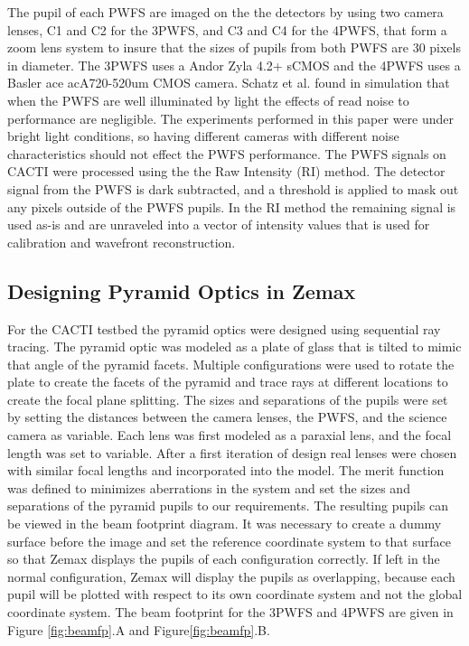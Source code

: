 The pupil of each PWFS are imaged on the the detectors by using two camera lenses, C1 and C2 for the 3PWFS, and C3 and C4 for the 4PWFS,  that form a zoom lens system to insure that the sizes of pupils from both PWFS are 30 pixels in diameter. The 3PWFS uses a Andor Zyla 4.2+ sCMOS and the 4PWFS uses a Basler ace acA720-520um CMOS camera. Schatz et al. found in simulation that when the PWFS are well illuminated by light the effects of read noise to performance are negligible. The experiments performed in this paper were under bright light conditions, so having different cameras with different noise characteristics should not effect the PWFS performance. The PWFS signals on CACTI were processed using the the Raw Intensity (RI) method. The detector signal from the PWFS is dark subtracted, and a threshold is applied to mask out any pixels outside of the PWFS pupils. In the RI method the remaining signal is used as-is and are unraveled into a vector of intensity values that is used for calibration and wavefront reconstruction.


\subsection{Designing Pyramid Optics in Zemax}

For the CACTI testbed the pyramid optics were designed using sequential ray tracing. The pyramid optic was modeled as a plate of glass that is tilted to mimic that angle of the pyramid facets. Multiple configurations were used to rotate the plate to create the facets of the pyramid and trace rays at different locations to create the focal plane splitting. The sizes and separations of the pupils were set by setting the distances between the camera lenses, the PWFS, and the science camera as variable. Each lens was first modeled as a paraxial lens, and the focal length was set to variable. After a first iteration of design real lenses were chosen with similar focal lengths and incorporated into the model. The merit function was defined to minimizes aberrations in the system and set the sizes and separations of the pyramid pupils to our requirements. The resulting pupils can be viewed in the beam footprint diagram. It was necessary to create a dummy surface before the image and set the reference coordinate system to that surface so that Zemax displays the pupils of each configuration correctly. If left in the normal configuration, Zemax will display the pupils as overlapping, because each pupil will be plotted with respect to its own coordinate system and not the global coordinate system. The beam footprint for the 3PWFS and 4PWFS are given in Figure \ref{fig:beamfp}.A and Figure\ref{fig:beamfp}.B. 

